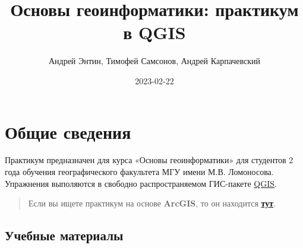 \documentclass[
  12pt,
]{book}
\title{Основы геоинформатики: практикум в QGIS}
\author{Андрей Энтин, Тимофей Самсонов, Андрей Карпачевский}
\date{2023-02-22}
\begin{document}
\maketitle

{
\hypersetup{linkcolor=}
\setcounter{tocdepth}{1}
\tableofcontents
}
\hypertarget{ux43eux431ux449ux438ux435-ux441ux432ux435ux434ux435ux43dux438ux44f}{%
\chapter*{Общие сведения}\label{ux43eux431ux449ux438ux435-ux441ux432ux435ux434ux435ux43dux438ux44f}}

Практикум предназначен для курса «Основы геоинформатики» для студентов 2 года обучения географического факультета МГУ имени М.В. Ломоносова. Упражнения выполяются в свободно распространяемом ГИС-пакете \href{https://www.qgis.org/ru/site/forusers/download.html}{QGIS}.

\begin{quote}
Если вы ищете практикум на основе \textbf{ArcGIS}, то он находится \href{https://tsamsonov.github.io/arcgis-course/}{\textbf{тут}}.
\end{quote}

\hypertarget{ux443ux447ux435ux431ux43dux44bux435-ux43cux430ux442ux435ux440ux438ux430ux43bux44b}{%
\section*{Учебные материалы}\label{ux443ux447ux435ux431ux43dux44bux435-ux43cux430ux442ux435ux440ux438ux430ux43bux44b}}
\end{document}
